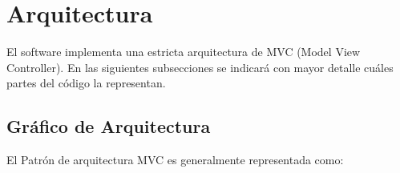 \documentclass[10pt]{article} %
\begin{document}



\section{Arquitectura}
El software implementa una estricta arquitectura de MVC (Model View Controller). En las siguientes subsecciones se indicará con mayor detalle cuáles partes del código la representan.

\subsection{Gráfico de Arquitectura}
El Patrón de arquitectura MVC es generalmente representada como:

\begin{figure}[H] %
\label{fig:GenericMVC}
\end{figure}

\end{document}
